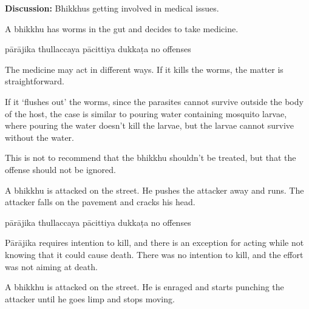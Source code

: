 \begin{exam}{\autoExamName}
\begin{problem*}
\begin{parts}
  \bigskip

  \textbf{Discussion:} Bhikkhus getting involved in medical issues.  

  \bigskip
  
  \item A bhikkhu has worms in the gut and decides to take medicine.

  \bigskip

  \begin{answers}{5}
    \bChoices
     pārājika\eAns
     thullaccaya\eAns
     pācittiya\eAns
     dukkaṭa\eAns
     no offenses\eAns
    \eChoices
  \end{answers}

  \begin{solution}
    The medicine may act in different ways. If it kills the worms, the matter is straightforward.

    If it `flushes out' the worms, since the parasites cannot survive outside the body of the host,
    the case is similar to pouring water containing mosquito larvae,
    where pouring the water doesn't kill the larvae,
    but the larvae cannot survive without the water.

    This is not to recommend that the bhikkhu shouldn't be treated,
    but that the offense should not be ignored.
  \end{solution}

  \item A bhikkhu is attacked on the street. He pushes the attacker away and runs. The
  attacker falls on the pavement and cracks his head.

  \bigskip

  \begin{answers}{5}
    \bChoices
     pārājika\eAns
     thullaccaya\eAns
     pācittiya\eAns
     dukkaṭa\eAns
     no offenses\eAns
    \eChoices
  \end{answers}

  \begin{solution}
    Pārājika requires intention to kill,
    and there is an exception for acting while not knowing that it could cause death.
    There was no intention to kill, and the effort was not aiming at death.
  \end{solution}

  \bigskip

  \item A bhikkhu is attacked on the street. He is enraged and starts punching the attacker
  until he goes limp and stops moving.


\end{parts}
\end{problem*}
\end{exam}
